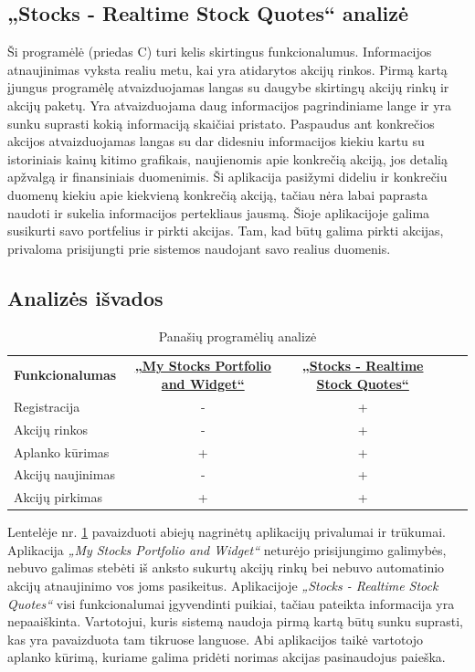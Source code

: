 \documentclass[a4paper,12pt,fleqn]{article}
\begin{document}
\subsection{„Stocks - Realtime Stock Quotes“ analizė}
Ši programėlė (priedas C) turi kelis skirtingus funkcionalumus.
Informacijos atnaujinimas vyksta realiu metu, kai yra atidarytos akcijų rinkos. Pirmą kartą įjungus programėlę atvaizduojamas langas su daugybe skirtingų akcijų rinkų ir akcijų paketų. Yra atvaizduojama daug informacijos pagrindiniame lange ir yra sunku suprasti kokią informaciją skaičiai pristato. Paspaudus ant konkrečios akcijos atvaizduojamas langas su dar didesniu informacijos kiekiu kartu su istoriniais kainų kitimo grafikais, naujienomis apie konkrečią akciją, jos detalią apžvalgą ir finansiniais duomenimis. Ši aplikacija pasižymi dideliu ir konkrečiu duomenų kiekiu apie kiekvieną konkrečią akciją, tačiau nėra labai paprasta naudoti ir sukelia informacijos pertekliaus jausmą. Šioje aplikacijoje galima susikurti savo portfelius ir pirkti akcijas. Tam, kad būtų galima pirkti akcijas, privaloma prisijungti prie sistemos naudojant savo realius duomenis.
\subsection{Analizės išvados}
\begin{table}[!ht]\centering
	\caption{Panašių programėlių analizė}
	\label{tabl:isvadu-lentele}
	\begin{tabular}{|l|c|c|ll}
		\cline{1-3}
		\textbf{Funkcionalumas} & \textbf{\href{https://play.google.com/store/apps/details?id=co.peeksoft.stocks}{„My Stocks Portfolio and Widget“}} & \textbf{\href{https://play.google.com/store/apps/details?id=org.dayup.stocks}{„Stocks - Realtime Stock Quotes“}} &  \\ \cline{1-3}
		Registracija&-&+& \\ \cline{1-3}
		Akcijų rinkos&-&+& \\ \cline{1-3}
		Aplanko kūrimas&+&+& \\ \cline{1-3}
		Akcijų naujinimas&-&+& \\ \cline{1-3}
		Akcijų pirkimas&+&+& \\ \cline{1-3}
	\end{tabular}
\end{table}
Lentelėje nr. \ref{tabl:isvadu-lentele} pavaizduoti abiejų nagrinėtų aplikacijų privalumai ir trūkumai. Aplikacija \textit{„My Stocks Portfolio and Widget“} neturėjo prisijungimo galimybės, nebuvo galimas stebėti iš anksto sukurtų akcijų rinkų bei nebuvo automatinio akcijų atnaujinimo vos joms pasikeitus. Aplikacijoje \textit{„Stocks - Realtime Stock Quotes“} visi funkcionalumai įgyvendinti puikiai, tačiau pateikta informacija yra nepaaiškinta. Vartotojui, kuris sistemą naudoja pirmą kartą būtų sunku suprasti, kas yra pavaizduota tam tikruose languose. Abi aplikacijos taikė vartotojo aplanko kūrimą, kuriame galima pridėti norimas akcijas pasinaudojus paieška.
 
\end{document}
